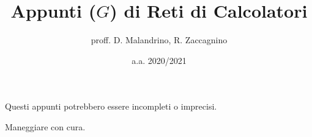 \documentclass{article}
\title{Appunti ($G$) di Reti di Calcolatori}
\author{proff. D. Malandrino, R. Zaccagnino}
\date{a.a. 2020/2021}
\begin{document}
\maketitle

\begin{center}
    Questi appunti potrebbero essere incompleti o imprecisi.
    
    Maneggiare con cura.
\end{center}

\tableofcontents


















\end{document}
